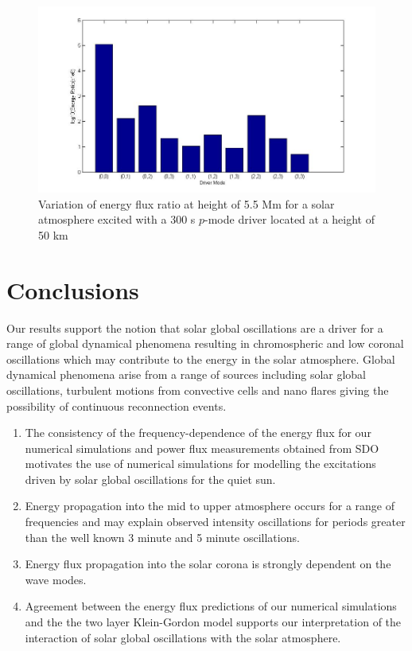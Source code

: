 \documentclass[preprint,authoryear,12pt]{elsarticle}
\begin{document}
\begin{figure}[t]
\includegraphics[scale=0.4]{imagesn/ratio_varoverdrve_eflux_vperiod_forallmodes_300s_5p5Mm.jpg}
\caption{Variation of energy flux ratio at height of 5.5 Mm for a solar atmosphere excited with a 300 s $p$-mode driver 
located at a height of 50 km}
\label{Fig19}
\end{figure}




\section{Conclusions}

Our results support the notion that solar global oscillations are a driver for a range of global dynamical phenomena 
resulting in chromospheric and low coronal oscillations which may contribute to the energy in the solar 
atmosphere.  Global dynamical phenomena arise from a range of sources including solar global oscillations, turbulent 
motions from convective cells and nano flares giving the possibility of continuous reconnection events.
   \begin{enumerate}
      \item The  consistency of the frequency-dependence of the energy flux for our numerical simulations and power 
      flux measurements obtained from SDO motivates the use of numerical simulations for modelling the excitations 
      driven by solar global oscillations for the quiet sun.
      \item Energy propagation into the mid to upper atmosphere occurs for a range of frequencies and may explain observed 
      intensity oscillations for periods greater than the well known 3 minute and 5 minute oscillations.  
      \item Energy flux propagation into the solar corona is strongly dependent on the wave modes.
 \item Agreement between the energy flux predictions of our numerical simulations and the the two layer 
      Klein-Gordon model supports our interpretation of the interaction of solar global oscillations with the solar atmosphere.
   \end{enumerate}
   
\end{document}
